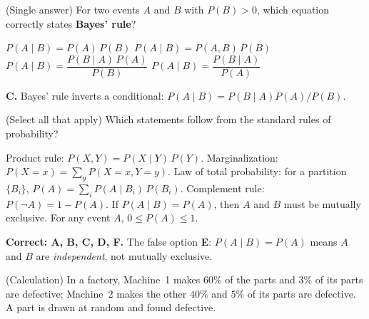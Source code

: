 \documentclass[answers,addpoints]{exam}
\begin{document}
\begin{questions}

\question[2] (Single answer) For two events $A$ and $B$ with $P(B)>0$, which
equation correctly states \textbf{Bayes' rule}?
\begin{choices}
  \choice $P(A\mid B)=P(A)\,P(B)$
  \choice $P(A\mid B)=P(A,B)\,P(B)$
  \CorrectChoice $P(A\mid B)=\dfrac{P(B\mid A)\,P(A)}{P(B)}$
  \choice $P(A\mid B)=\dfrac{P(B\mid A)}{P(A)}$
\end{choices}
\begin{solution}\textbf{C.} Bayes' rule inverts a conditional: $P(A\mid B)=P(B\mid A)P(A)/P(B)$.\end{solution}

\question[3] (Select all that apply) Which statements follow from the standard
rules of probability?
\begin{checkboxes}
  \CorrectChoice Product rule: $P(X,Y)=P(X\mid Y)\,P(Y)$.
  \CorrectChoice Marginalization: $P(X{=}x)=\sum_{y}P(X{=}x,Y{=}y)$.
  \CorrectChoice Law of total probability: for a partition $\{B_i\}$,
        $P(A)=\sum_i P(A\mid B_i)\,P(B_i)$.
  \CorrectChoice Complement rule: $P(\lnot A)=1-P(A)$.
  \choice If $P(A\mid B)=P(A)$, then $A$ and $B$ must be mutually exclusive.
  \CorrectChoice For any event $A$, $0\le P(A)\le 1$.
\end{checkboxes}
\begin{solution}
\textbf{Correct: A, B, C, D, F.} The false option \textbf{E}: $P(A\mid B)=P(A)$
means $A$ and $B$ are \emph{independent}, not mutually exclusive.
\end{solution}

\question[5] (Calculation) In a factory, Machine~1 makes $60\%$ of the parts and
$3\%$ of its parts are defective; Machine~2 makes the other $40\%$ and $5\%$ of
its parts are defective. A part is drawn at random and found defective.
\end{questions}
\end{document}
